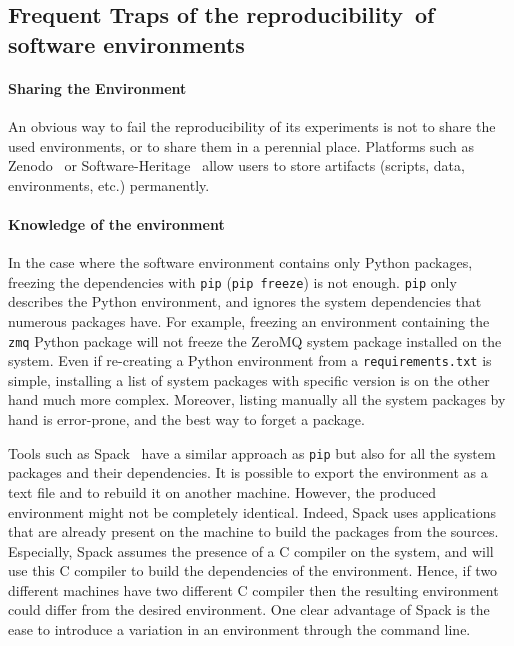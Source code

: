 \documentclass[sigconf]{acmart}
\newcommand{\repro}{reproducibility}
\begin{document}
\subsection{Frequent Traps of the \repro\ of software environments}\label{sec:expe:repro:sw}


\paragraph{Sharing the Environment}

An obvious way to fail the reproducibility of its experiments is not to share the used environments, or to share them in a perennial place.
Platforms such as Zenodo\ \cite{zenodo} or Software-Heritage\ \cite{swheritage} allow users to store artifacts (scripts, data, environments, etc.) permanently.


\paragraph{Knowledge of the environment}

In the case where the software environment contains only Python packages, freezing the dependencies with \texttt{pip} (\texttt{pip freeze}) is not enough.
\texttt{pip} only describes the Python environment, and ignores the system dependencies that numerous packages have. 
For example, freezing an environment containing the \texttt{zmq} Python package will not freeze the ZeroMQ system package installed on the system.  
Even if re-creating a Python environment from a \texttt{requirements.txt} is simple, installing a list of system packages with specific version is on the other hand much more complex.
Moreover, listing manually all the system packages by hand is error-prone, and the best way to forget a package.

Tools such as Spack\ \cite{gamblin_spack_2015} have a similar approach as \texttt{pip} but also for all the system packages and their dependencies.
It is possible to export the environment as a text file and to rebuild it on another machine.
However, the produced environment might not be completely identical.
Indeed, Spack uses applications that are already present on the machine to build the packages from the sources.
Especially, Spack assumes the presence of a C compiler on the system, and will use this C compiler to build the dependencies of the environment.
Hence, if two different machines have two different C compiler then the resulting environment could differ from the desired environment.
One clear advantage of Spack is the ease to introduce a variation in an environment through the command line.
\end{document}
